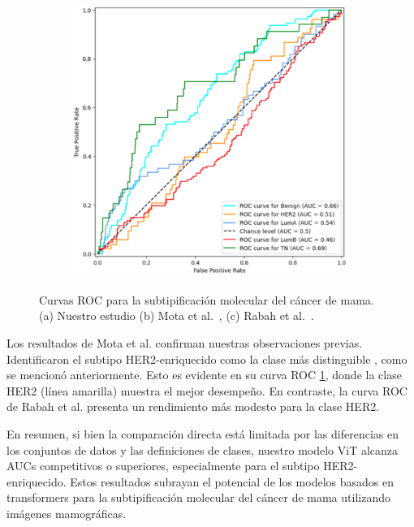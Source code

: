 \documentclass[a4paper,10pt]{book}
\begin{document}
\begin{figure}[h!]
\begin{subfigure}[t]{0.32\textwidth}
        \caption{}
        \label{fig:mota_auc}
    \end{subfigure}
    \begin{subfigure}[t]{0.32\textwidth}
        \centering
        \includegraphics[width=\textwidth]{reports/assets/rabaMulticlass.png}
        \caption{}
        \label{fig:rabah_auc}
    \end{subfigure}
    \caption[Comparación de AUC entre estudios]{Curvas ROC para la subtipificación molecular del cáncer de mama. (a) Nuestro estudio (b) Mota et al.~\cite{mota_breast_2024}, (c) Rabah et al.~\cite{ben_rabah_multimodal_2025}.}
    \label{fig:auc_comparison}
\end{figure}

Los resultados de Mota et al. confirman nuestras observaciones previas. Identificaron el subtipo HER2-enriquecido como la clase más distinguible \cite{mota_breast_2024}, como se mencionó anteriormente. Esto es evidente en su curva ROC \ref{fig:mota_auc}, donde la clase HER2 (línea amarilla) muestra el mejor desempeño. En contraste, la curva ROC de Rabah et al. presenta un rendimiento más modesto para la clase HER2.

En resumen, si bien la comparación directa está limitada por las diferencias en los conjuntos de datos y las definiciones de clases, nuestro modelo ViT alcanza AUCs competitivos o superiores, especialmente para el subtipo HER2-enriquecido. Estos resultados subrayan el potencial de los modelos basados en transformers para la subtipificación molecular del cáncer de mama utilizando imágenes mamográficas.
\end{document}
